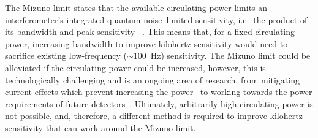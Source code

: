 The Mizuno limit states that the available circulating power limits an interferometer's integrated quantum noise--limited sensitivity, i.e.\ the product of its bandwidth and peak sensitivity~\cite{miaoFundamentalQuantumLimit2017} .
This means that, for a fixed circulating power, increasing bandwidth to improve kilohertz sensitivity would need to sacrifice existing low-frequency ($\sim100$~Hz) sensitivity. %
The Mizuno limit could be alleviated if the circulating power could be increased, however, this is technologically challenging and is an ongoing area of research, from mitigating current effects which prevent increasing the power~\cite{Brooks_2021,PhysRevLett.114.161102} to working towards the power requirements of future detectors~\cite{}. 
Ultimately, arbitrarily high circulating power is not possible, and, therefore, a different method is required to improve kilohertz sensitivity that can work around the Mizuno limit.

